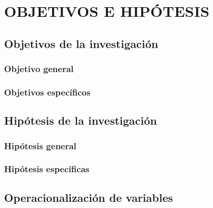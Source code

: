 \chapter{OBJETIVOS E HIPÓTESIS}
\section{Objetivos de la investigación}
\subsection{Objetivo general}
\subsection{Objetivos específicos}
\section{Hipótesis de la investigación}
\subsection{Hipótesis general}
\subsection{Hipótesis específicas}
\section{Operacionalización de variables}
